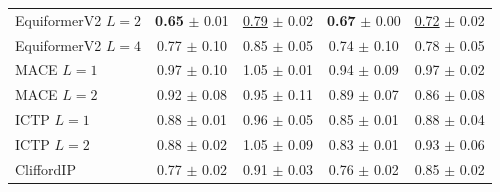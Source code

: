 \begin{table}[!htbp]
\begin{tabular*}{\textwidth}{@{\extracolsep{\fill}}lcccc@{}}
EquiformerV2 $L{=}2$ & \textbf{0.65} $\pm$ 0.01 & \underline{0.79} $\pm$ 0.02 & \textbf{0.67} $\pm$ 0.00 & \underline{0.72} $\pm$ 0.02 \\
EquiformerV2 $L{=}4$ & 0.77 $\pm$ 0.10 & 0.85 $\pm$ 0.05 & 0.74 $\pm$ 0.10 & 0.78 $\pm$ 0.05 \\
MACE $L{=}1$ & 0.97 $\pm$ 0.10 & 1.05 $\pm$ 0.01 & 0.94 $\pm$ 0.09 & 0.97 $\pm$ 0.02 \\
MACE $L{=}2$ & 0.92 $\pm$ 0.08 & 0.95 $\pm$ 0.11 & 0.89 $\pm$ 0.07 & 0.86 $\pm$ 0.08 \\
ICTP $L{=}1$ & 0.88 $\pm$ 0.01 & 0.96 $\pm$ 0.05 & 0.85 $\pm$ 0.01 & 0.88 $\pm$ 0.04 \\
ICTP $L{=}2$ & 0.88 $\pm$ 0.02 & 1.05 $\pm$ 0.09 & 0.83 $\pm$ 0.01 & 0.93 $\pm$ 0.06 \\
CliffordIP & 0.77 $\pm$ 0.02 & 0.91 $\pm$ 0.03 & 0.76 $\pm$ 0.02 & 0.85 $\pm$ 0.02 \\
\bottomrule
\end{tabular*}
\end{table}

